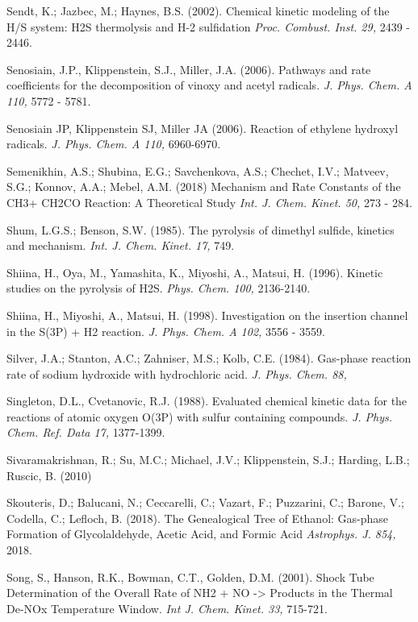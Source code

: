 \documentclass[12pt,landscape]{article}
\newcounter{reaction}
\begin{document}
Sendt, K.; Jazbec, M.; Haynes, B.S. (2002).
Chemical kinetic modeling of the H/S system: H2S thermolysis and H-2 sulfidation
{\em Proc. Combust. Inst. 29,} 2439 - 2446.

  Senosiain, J.P., Klippenstein, S.J., Miller, J.A. (2006). Pathways and rate coefficients for the decomposition of vinoxy and acetyl radicals.  {\em J. Phys. Chem. A 110,} 5772 - 5781.

Senosiain JP, Klippenstein SJ, Miller JA (2006).  Reaction of ethylene hydroxyl radicals.  {\em J. Phys. Chem. A 110,} 6960-6970.

Semenikhin, A.S.; Shubina, E.G.; Savchenkova, A.S.; Chechet, I.V.; Matveev, S.G.; Konnov, A.A.; Mebel, A.M. (2018)
Mechanism and Rate Constants of the CH3+ CH2CO Reaction: A Theoretical Study
{\em Int. J. Chem. Kinet. 50,}  273 - 284.

Shum, L.G.S.; Benson, S.W. (1985). The pyrolysis of dimethyl sulfide, kinetics and mechanism.  {\em Int. J. Chem. Kinet. 17,} 749.

Shiina, H., Oya, M., Yamashita, K., Miyoshi, A., Matsui, H. (1996). Kinetic studies on the pyrolysis of H2S. {\em  Phys. Chem. 100,} 2136-2140.

Shiina, H., Miyoshi, A., Matsui, H. (1998). Investigation on the insertion channel in the S(3P) + H2 reaction.  {\em J. Phys. Chem. A 102,} 3556 - 3559.

Silver, J.A.; Stanton, A.C.; Zahniser, M.S.; Kolb, C.E. (1984). Gas-phase reaction rate of sodium hydroxide with hydrochloric acid.  {\em J. Phys. Chem.  88,}

Singleton, D.L., Cvetanovic, R.J.  (1988). Evaluated chemical kinetic data for the reactions of atomic oxygen O(3P) with sulfur containing compounds.  {\em J. Phys. Chem. Ref. Data 17,} 1377-1399.

Sivaramakrishnan, R.; Su, M.C.; Michael, J.V.; Klippenstein, S.J.; Harding, L.B.; Ruscic, B. (2010)

Skouteris, D.; Balucani, N.; Ceccarelli, C.; Vazart, F.; Puzzarini, C.; Barone, V.; Codella, C.; Lefloch, B. (2018).
The Genealogical Tree of Ethanol: Gas-phase Formation of Glycolaldehyde, Acetic Acid, and Formic Acid
{\em Astrophys. J.  854,}  2018.

Song, S., Hanson, R.K., Bowman, C.T., Golden, D.M.  (2001). Shock Tube Determination of the Overall Rate of NH2 + NO -> Products in the Thermal De-NOx Temperature Window.  {\em Int J. Chem. Kinet. 33,} 715-721.
\end{document}
